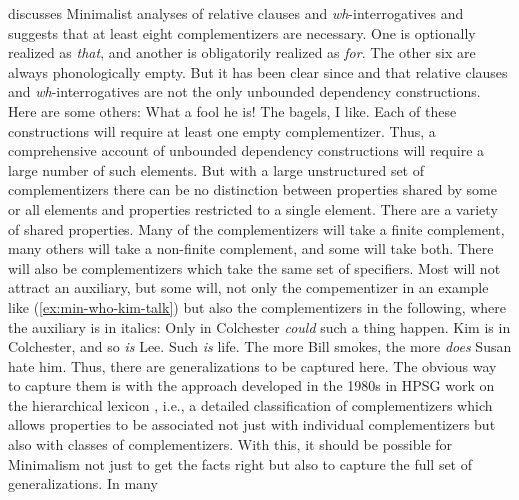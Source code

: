 \documentclass[output=paper
	        ,collection
	        ,collectionchapter
 	        ,biblatex
                ,babelshorthands
                ,newtxmath
                ,draftmode
                ,colorlinks, citecolor=brown
]{langscibook}
\begin{document}
\citet{Borsley2006a,Borsley2017a} discusses Minimalist analyses of relative clauses and \emph{wh}-interrogatives and suggests that at least eight complementizers are necessary. One is optionally realized as \emph{that}, and another is obligatorily realized as \emph{for}. The other six are always phonologically empty. But it has been clear since \citet{Ross67} and \citet{Chomsky77a-u} that relative clauses and \emph{wh}-interrogatives are not the only unbounded dependency constructions. Here are some others:
\eal
\settowidth{}
\ex What a fool he is!                          
\ex The bagels, I like.	                        
\zl 
Each of these constructions will require at least one empty complementizer. Thus, a comprehensive
account of unbounded dependency constructions will require a large number of such elements. 
But with a large unstructured set of complementizers there can be no distinction between properties
shared by some or all elements and properties restricted to a single element. There are a variety of shared properties. Many of the
complementizers will take a finite complement, many others will take a non-finite complement, and
some will take both. There will also be complementizers which take the same set of specifiers. Most
will not attract an auxiliary, but some will, not only the compementizer in an example like
(\ref{ex:min-who-kim-talk}) but also the complementizers in the following, where the auxiliary is in
italics: 
\eal
\ex Only in Colchester \emph{could} such a thing happen.
\ex Kim is in Colchester, and so \emph{is} Lee.
\ex Such \emph{is} life.
\ex The more Bill smokes, the more \emph{does} Susan hate him.
\zl
Thus, there are generalizations to be captured here. The obvious way to capture them is with the
approach developed in the 1980s in HPSG work on the hierarchical lexicon \citep*{FPW85a,Flickinger87}, i.e., a detailed
classification of complementizers which allows properties to be associated not just with individual
complementizers but also with classes of complementizers. With this, it should be possible for
Minimalism not just to get the facts right but also to capture the full set of generalizations. In many
\end{document}

